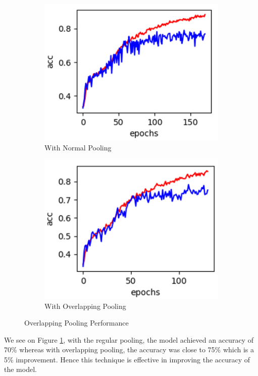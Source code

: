 \documentclass[../main.tex]{subfiles}
\begin{document}
\begin{figure}[h!]
  \centering
  \begin{subfigure}[b]{0.35\linewidth}
    \includegraphics[width=\linewidth]{withdo-without-pool.png}
    \caption{With Normal Pooling}
  \end{subfigure}
  \begin{subfigure}[b]{0.35\linewidth}
    \includegraphics[width=\linewidth]{withdo-overlap-pooling.png}
    \caption{With Overlapping Pooling}
  \end{subfigure}
  \caption{Overlapping Pooling Performance}
  \label{fig:pooling-performance}
\end{figure}

We see on Figure \ref{fig:pooling-performance}, with the regular pooling, the model achieved an accuracy of 70\% whereas with overlapping pooling, the accuracy was close to 75\% which is a 5\% improvement. Hence this technique is effective in improving the accuracy of the model.
\end{document}
